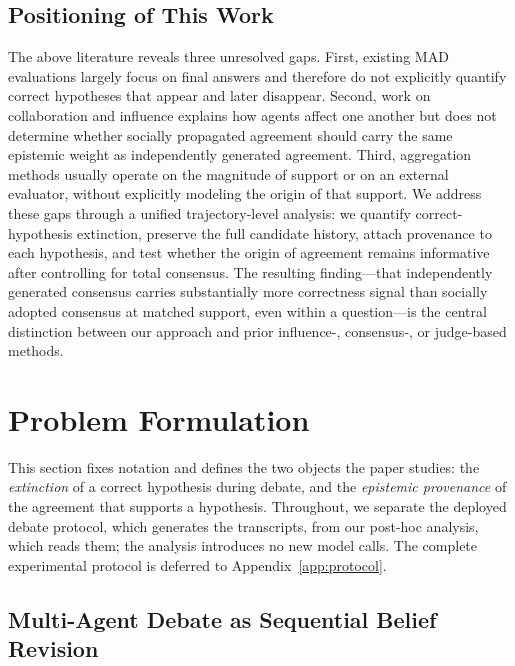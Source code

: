 \subsection{Positioning of This Work}
\label{subsec:rw_positioning}

The above literature reveals three unresolved gaps. First, existing MAD evaluations largely focus on final answers and therefore do not explicitly quantify correct hypotheses that appear and later disappear. Second, work on collaboration and influence explains how agents affect one another but does not determine whether socially propagated agreement should carry the same epistemic weight as independently generated agreement. Third, aggregation methods usually operate on the magnitude of support or on an external evaluator, without explicitly modeling the origin of that support. We address these gaps through a unified trajectory-level analysis: we quantify correct-hypothesis extinction, preserve the full candidate history, attach provenance to each hypothesis, and test whether the origin of agreement remains informative after controlling for total consensus. The resulting finding---that independently generated consensus carries substantially more correctness signal than socially adopted consensus at matched support, even within a question---is the central distinction between our approach and prior influence-, consensus-, or judge-based methods.


\section{Problem Formulation}
\label{sec:problem_formulation}

This section fixes notation and defines the two objects the paper studies: the \emph{extinction} of a
correct hypothesis during debate, and the \emph{epistemic provenance} of the agreement that supports a
hypothesis. Throughout, we separate the deployed debate protocol, which generates the transcripts, from
our post-hoc analysis, which reads them; the analysis introduces no new model calls. The complete
experimental protocol is deferred to Appendix~\ref{app:protocol}.

\subsection{Multi-Agent Debate as Sequential Belief Revision}
\label{subsec:mad_formulation}

